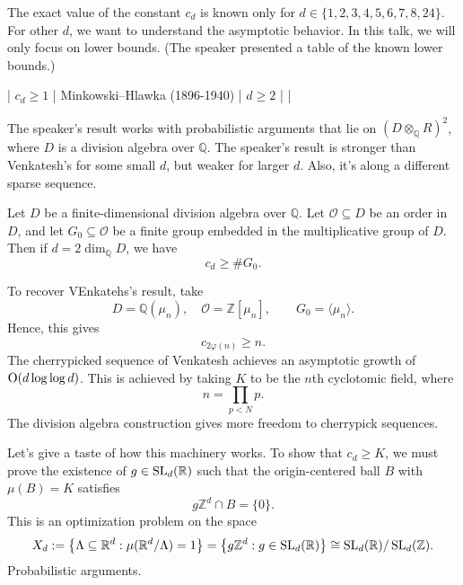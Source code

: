 \documentclass[reqno]{amsart} 
\begin{document}
The exact value of the constant $c_d $ is known only for $d \in \{1,2,3,4,5,6,7,8,24\}$.  For other $d$, we want to understand the asymptotic behavior.  In this talk, we will only focus on lower bounds.  (The speaker presented a table of the known lower bounds.)

| $c_d \geq 1$ | Minkowski--Hlawka (1896-1940) | $d \geq 2$ | |

The speaker's result works with probabilistic arguments that lie on $(D \otimes_{\mathbb{Q}} R)^2 $, where $D$ is a division algebra over $\mathbb{Q}$.  The speaker's result is stronger than Venkatesh's for some small $d$, but weaker for larger $d$.  Also, it's along a different sparse sequence.

\begin{theorem}[G. 2022]
  Let $D$ be a finite-dimensional division algebra over $\mathbb{Q}$.  Let $\mathcal{O} \subseteq D$ be an order in $D$, and let $G_0 \subseteq \mathcal{O} $ be a finite group embedded in the multiplicative group of $D$.  Then if $d = 2 \dim_{\mathbb{Q} } D$, we have
  \begin{equation*}
    c_d \geq \# G_0.
  \end{equation*}
\end{theorem}
To recover VEnkatehs's result, take
\begin{equation*}
  D = \mathbb{Q} (\mu_n ),
  \quad
  \mathcal{O} = \mathbb{Z} [\mu_n ],
  \qquad
  G_0 = \langle \mu_n  \rangle.
\end{equation*}
Hence, this gives
\begin{equation*}
  c_{2 \varphi (n)} \geq n.
\end{equation*}
The cherrypicked sequence of Venkatesh achieves an asymptotic growth of $\operatorname{O}(d \log \log d)$.  This is achieved by taking $K$ to be the $n$th cyclotomic field, where
\begin{equation*}
  n = \prod_{p < N} p.
\end{equation*}
The division algebra construction gives more freedom to cherrypick sequences.

Let's give a taste of how this machinery works.  To show that $c_d \geq K$, we must prove the existence of $g \in \operatorname{SL}_d (\mathbb{R} )$ such that the origin-centered ball $B$ with $\mu (B) = K$ satisfies
\begin{equation*}
  g \mathbb{Z}^d \cap B = \{0\}.
\end{equation*}
This is an optimization problem on the space
\begin{equation*}
  X_d := \left\{ \Lambda \subseteq \mathbb{R}^d  : \mu (\mathbb{R}^d / \Lambda ) = 1 \right\}
  =
  \left\{ g \mathbb{Z}^d  : g \in \operatorname{SL}_d (\mathbb{R} ) \right\}
  \cong \operatorname{SL}_d (\mathbb{R} ) / \operatorname{SL}_d (\mathbb{Z} ).  
\end{equation*}
Probabilistic arguments.
\end{document}
